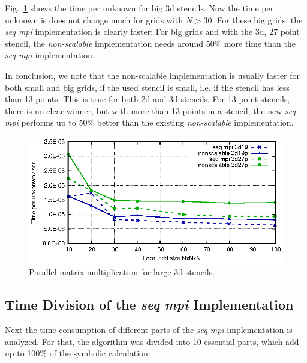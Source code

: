Fig.~\ref{fig:mat_ex_test_ex2_times_3dlarge} shows the time per unknown for big 3d stencils. Now the time per unknown is does not change much for grids with $N > 30$. For these big grids, the \textit{seq mpi} implementation is clearly faster: For big grids and with the 3d, 27 point stencil, the \textit{non-scalable} implementation needs around 50\% more time than the \textit{seq mpi} implementation. 

In conclusion, we note that the non-scalable implementation is usually faster for both small and big grids, if the used stencil is small, i.e. if the stencil has less than 13 points. This is true for both 2d and 3d stencils. For 13 point stencils, there is no clear winner, but with more than 13 points in a stencil, the new \textit{seq mpi} performs up to 50\% better than the existing \textit{non-scalable} implementation.

\begin{figure}[tbp]
	\centering
	\vspace*{-2.5mm}\includegraphics[width=1\textwidth]{times_3dlarge}
	\caption{Parallel matrix multiplication for large 3d stencils.} 
	\label{fig:mat_ex_test_ex2_times_3dlarge}
\end{figure}

\subsection{Time Division of the \textit{seq mpi} Implementation}

Next the time consumption of different parts of the \textit{seq mpi} implementation is analyzed. For that, the algorithm was divided into 10 essential parts, which add up to 100\% of the symbolic calculation:

